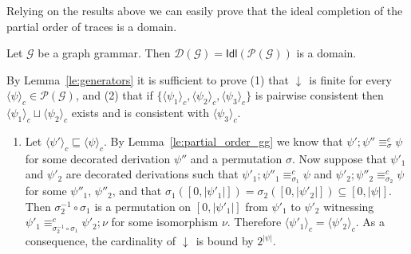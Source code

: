 \documentclass[conference]{IEEEtran}
\renewenvironment{proof}{\begin{IEEEproof}}{\end{IEEEproof}}
\newcommand{\principal}[1]{\ensuremath{\mathop{\downarrow\!{#1}}}}
\newcommand{\ideal}[1]{\ensuremath{\mathsf{Idl}({#1})}}
\newcommand{\slice}[2]{\ensuremath{({#1} \downarrow {#2})}}
\newcommand{\zdom}[0]{\ensuremath{\mathcal{D}}}
\newcommand{\dom}[1]{\ensuremath{\zdom({#1})}}
\newcommand{\poset}[1]{\ensuremath{\mathcal{P}({#1})}}
\newcommand{\interval}[2][1]{\ensuremath{[{#1},{#2}]}}
\newcommand{\perm}{\sigma}
\newcommand{\tr}[1]{\ensuremath{\mathsf{Tr}({#1})}}
\newcommand{\ltrace}[1]{\ensuremath{\langle {#1}\rangle_c}}
\begin{document}
Relying on the results above we can easily prove that the ideal
completion of the partial order of traces is a domain.

\begin{proposition} 
  \label{pr:domain-gg} 
  Let $\mathcal{G}$ be a graph grammar. Then
  $\dom{\mathcal{G}} =  \ideal{\poset{\mathcal{G}}}$
  is a
  domain.
\end{proposition}

\begin{proof}
  By Lemma~\ref{le:generators}
  it is sufficient to prove 
  (1) that
  $\principal{\ltrace{\psi}}$ is finite for every $\ltrace{\psi} \in
  \poset{\mathcal{G}}$, and (2) that if $\{\ltrace{\psi_1},
  \ltrace{\psi_2},
  \ltrace{\psi_3}\}$ is pairwise consistent then $\ltrace{\psi_1}
  \sqcup
  \ltrace{\psi_2}$ exists and is consistent with $\ltrace{\psi_3}$.


  
  \begin{enumerate}
  
  \item Let $\ltrace{\psi'} \sqsubseteq \ltrace{\psi}$. By
    Lemma~\ref{le:partial_order_gg}
    we know that
    $\psi';\psi'' \equiv^c_{\perm} \psi$ for some decorated derivation
    $\psi''$ and a
    permutation $\perm$.  Now suppose that
    $\psi'_1$ and $\psi'_2$ are decorated derivations such that
    $\psi'_1;\psi''_1 \equiv^c_{\perm_1} \psi$ and
    $\psi'_2;\psi''_2 \equiv^c_{\perm_2} \psi$ for some $\psi''_1$,
    $\psi''_2$, and that
    $\perm_1(\interval[0]{|\psi'_1|}) =
    \perm_2(\interval[0]{|\psi'_2|}) \subseteq
    \interval[0]{|\psi|}$. Then $\perm_2^{-1}\circ \perm_1$ is a
    permutation on $\interval[0]{|\psi'_1|}$ from $\psi'_1$ to
    $\psi'_2$ witnessing $\psi'_1 \equiv^c_{\perm_2^{-1}\circ \perm_1} \psi'_2; \nu$ for some isomorphism $\nu$. 
    Therefore
    $\ltrace{\psi'_1} = \ltrace{\psi'_2}$.  As a consequence, the
    cardinality of $\principal{\ltrace{\psi}}$ is bound by
    $2^{|\psi|}$.
  

\end{enumerate}
\end{proof}
\end{document}
